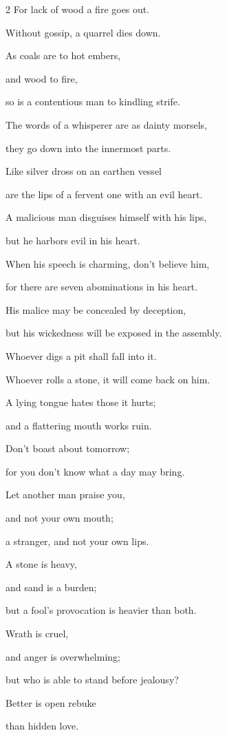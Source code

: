 \begin{multicols}{2}
\myverse{}For lack of wood a fire goes out.

Without gossip, a quarrel dies down.


\myverse{}As coals are to hot embers,

and wood to fire,

so is a contentious man to kindling strife.


\myverse{}The words of a whisperer are as dainty morsels,

they go down into the innermost parts.


\myverse{}Like silver dross on an earthen vessel

are the lips of a fervent one with an evil heart.


\myverse{}A malicious man disguises himself with his lips,

but he harbors evil in his heart.


\myverse{}When his speech is charming, don’t believe him,

for there are seven abominations in his heart.


\myverse{}His malice may be concealed by deception,

but his wickedness will be exposed in the assembly.


\myverse{}Whoever digs a pit shall fall into it.

Whoever rolls a stone, it will come back on him.


\myverse{}A lying tongue hates those it hurts;

and a flattering mouth works ruin.


\mychapter{} \myverse*{}Don’t boast about tomorrow;

\quad\quad for you don’t know what a day may bring.


\myverse{}Let another man praise you,

and not your own mouth;

a stranger, and not your own lips.


\myverse{}A stone is heavy,

and sand is a burden;

but a fool’s provocation is heavier than both.


\myverse{}Wrath is cruel,

and anger is overwhelming;

but who is able to stand before jealousy?


\myverse{}Better is open rebuke

than hidden love.



\end{multicols}
